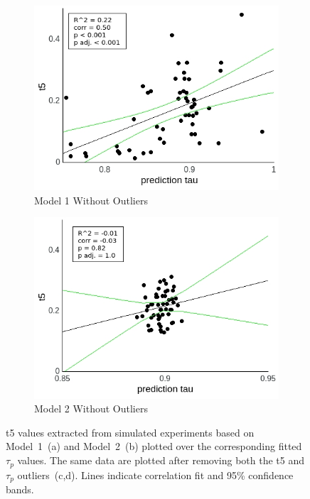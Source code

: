 \documentclass[a4paper]{scrreprt}
\begin{document}
\begin{figure}
\begin{subfigure}[b]{0.49\textwidth}
        \includegraphics[width=\textwidth]{figs/sec3/pred/predno_t5no_mod1.jpeg}
        \caption{Model 1 Without Outliers}
    \end{subfigure}
    \begin{subfigure}[b]{0.49\textwidth}
        \includegraphics[width=\textwidth]{figs/sec3/pred/predno_t5no_mod2.jpeg}
        \caption{Model 2 Without Outliers}
    \end{subfigure}
\caption{t5 values extracted from simulated experiments based on Model~1~(a) and Model~2~(b) plotted over the corresponding fitted $\tau_p$ values. The same data are plotted after removing both the t5 and $\tau_p$ outliers~(c,d). Lines indicate correlation fit and 95\% confidence bands.}
\label{fig:pred_t5}
\end{figure}
\end{document}
